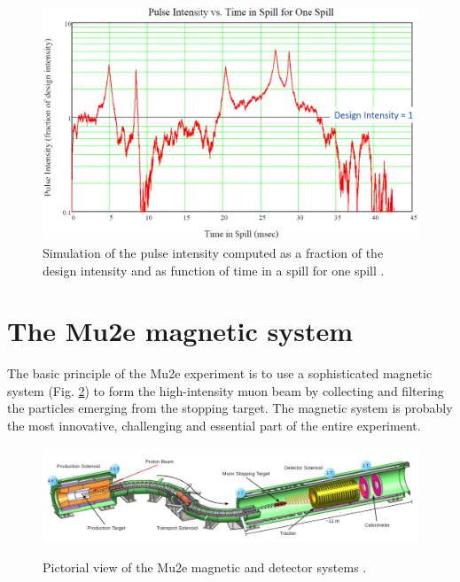 \documentclass[12pt,a4paper,openright, oneside, titlepage]{book} %
\begin{document}
\begin{figure}[h!]
\centering
\includegraphics[scale=0.6]{POT_sim}
\caption{Simulation of the pulse intensity computed as a fraction  
of the design intensity and 
as function of time in a spill for one spill \cite{SpillSim}.}
\label{_POT_sim}
\end{figure}

\section{The Mu2e magnetic system}
The basic principle of the Mu2e experiment is to use a sophisticated magnetic system (Fig. \ref{_mu2e_apparatus_pre}) 
to form the high-intensity muon beam by collecting and filtering the particles emerging from the stopping target. 
The magnetic system is probably the most innovative, challenging and essential part of the entire experiment. 

\begin{figure}[h!]
\centering
\includegraphics[scale=0.6]{mu2e_apparatus}\\
\caption{Pictorial view of the Mu2e magnetic and detector systems \cite{Giovannella}.}
\label{_mu2e_apparatus_pre}
\end{figure}
\end{document}
